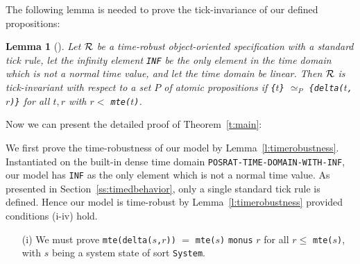 \documentclass[10pt,journal]{IEEEtran}
\newcommand{\hide}[1]{\ignorespaces}
\newtheorem{lemma}[theorem]{Lemma}
\begin{document}
The following lemma is needed to prove the tick-invariance of our
defined propositions:
\begin{lemma}[\cite{DBLP:journals/entcs/OlveczkyM07a}]
Let $\cal R$ be a time-robust object-oriented specification with a
standard tick rule, let the infinity element \verb|INF| be the only
element in the time domain which is not a normal time value, and let
the time domain be \emph{linear}. Then $\cal R$ is tick-invariant with
respect to a set $P$ of atomic propositions if \verb|{|$t$\verb|}|
$\simeq_P$ \verb|{delta(|$t$\verb|,|$r$\verb|)}| for all $t,r$ with
$r<$ \verb|mte(|$t$\verb|)|.
\end{lemma}

Now we can present the detailed proof of Theorem~\ref{t:main}:
\noindent
\begin{IEEEproof}
We first prove the time-robustness of our model by
Lemma~\ref{l:timerobustness}.  Instantiated on the built-in dense time
domain \verb|POSRAT-TIME-DOMAIN-WITH-INF|, our model has \verb|INF| as
the only element which is not a normal time value. As presented in
Section~\ref{ss:timedbehavior}, only a single standard tick rule is
defined. Hence our model is time-robust by
Lemma~\ref{l:timerobustness} provided conditions (i-iv) hold.
\begin{enumerate}
\item[(i)] We must prove \verb|mte(delta(|$s$\verb|,|$r$\verb|))| $=$
  \verb|mte(|$s$\verb|)| \verb|monus| $r$ for all $r\le$
  \verb|mte(|$s$\verb|)|, with $s$ being a system state of sort
  \verb|System|.
\end{enumerate}

\end{IEEEproof}



\hide{
\ifCLASSOPTIONcompsoc
  \section*{Acknowledgments}
\else
  \section*{Acknowledgment}
\fi

The authors would like to thank...
}

\ifCLASSOPTIONcaptionsoff
  \newpage
\fi
\end{document}
